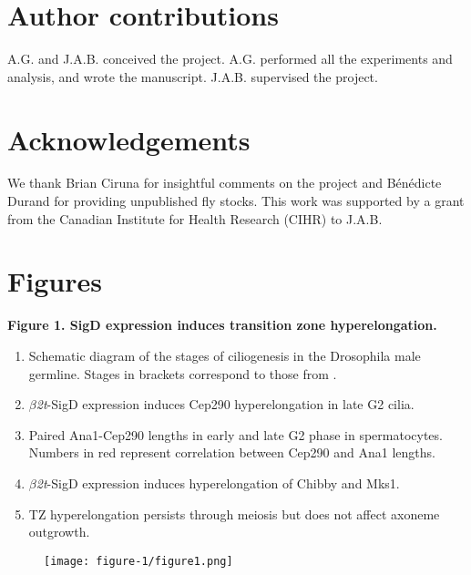 \documentclass[12pt, twoside, letterpaper]{article}
\newcommand{\sigd}{$\beta$\textit{2t}-SigD}
\begin{document}
\section{Author contributions}
A.G. and J.A.B. conceived the project.
A.G. performed all the experiments and analysis, and wrote the manuscript.
J.A.B. supervised the project.


\section{Acknowledgements}
We thank Brian Ciruna for insightful comments on the project
and Bénédicte Durand for providing unpublished fly stocks.
This work was supported by a grant from the Canadian Institute for Health Research
(CIHR) to J.A.B.




\newpage
\section{Figures}

%
\textbf{Figure 1. SigD expression induces transition zone hyperelongation.}
\begin{enumerate}[label={\Alph*.}, nolistsep]
\item Schematic diagram of the stages of ciliogenesis in the Drosophila male germline.
  Stages in brackets correspond to those from \citep{cenci1994chromatin}.
\item \sigd{} expression induces Cep290 hyperelongation in late G2 cilia.
\item Paired Ana1-Cep290 lengths in early and late G2 phase in spermatocytes.
  Numbers in red represent correlation between Cep290 and Ana1 lengths.
\item \sigd{} expression induces hyperelongation of Chibby and Mks1.
\item TZ hyperelongation persists through meiosis but does not affect
  axoneme outgrowth.
\end{enumerate}

\begin{figure}[ht]
  \texttt{[image: figure-1/figure1.png]}
\end{figure}
\newpage
\end{document}
